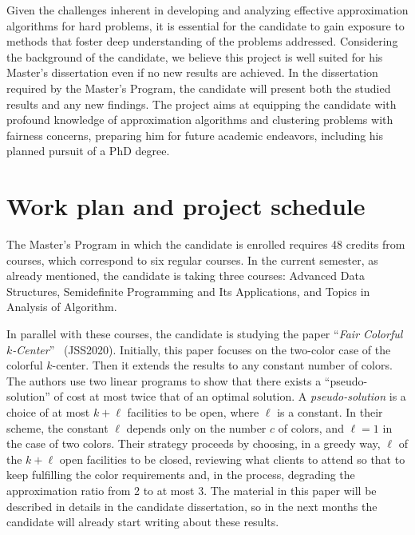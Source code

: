 \documentclass[12pt]{article}
\begin{document}
Given the challenges inherent in developing and analyzing effective approximation algorithms for hard problems, 
it is essential for the candidate to gain exposure to methods that foster deep understanding of the problems addressed.
Considering the background of the candidate, we believe this project is well suited for his Master's dissertation
even if no new results are achieved. 
In the dissertation required by the Master's Program, the candidate will present both the studied results and any new findings.
The project aims at equipping the candidate with profound knowledge of approximation algorithms 
and clustering problems with fairness concerns, preparing him for future academic endeavors, including his planned pursuit of a PhD degree.

\section{Work plan and project schedule}

The Master's Program in which the candidate is enrolled requires 48 credits from courses, which correspond to six regular courses. 
In the current semester, as already mentioned, the candidate is taking three courses: Advanced Data Structures, Semidefinite Programming and Its Applications, and Topics in Analysis of Algorithm. 

In parallel with these courses, the candidate is studying the paper ``\emph{Fair Colorful $k$-Center}''~\cite{JSS2020} (JSS2020). 
Initially, this paper focuses on the two-color case of the colorful $k$-center. 
Then it extends the results to any constant number of colors. 
The authors use two linear programs to show that there exists a ``pseudo-solution'' of cost at most twice that of an optimal solution. 
A \emph{pseudo-solution} is a choice of at most $k + \ell$ facilities to be open, where $\ell$ is a constant. In their scheme, the constant $\ell$ depends only on the number $c$ of colors, and $\ell = 1$ in the case of two colors.
Their strategy proceeds by choosing, in a greedy way, $\ell$ of the $k+\ell$ open facilities to be closed, reviewing what clients to attend so that to keep fulfilling the color requirements and, in the process, degrading the approximation ratio from 2 to at most 3.
The material in this paper will be described in details in the candidate dissertation, so in the next months the candidate will already start writing about these results.
\end{document}
